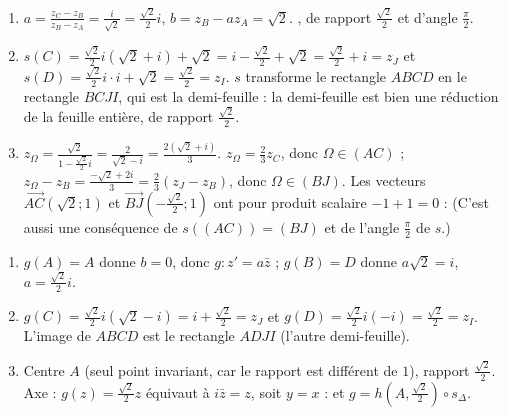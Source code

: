 \begin{corrige}
\begin{sol}
\begin{description}
\begin{enumerate}
            \item $a = \frac{z_C - z_B}{z_B - z_A} = \frac{i}{\sqrt2} = \frac{\sqrt2}{2}i$, $b = z_B - a z_A = \sqrt2$.
                  , de rapport $\frac{\sqrt2}{2}$ et d'angle $\frac{\pi}{2}$.
            \item $s(C) = \frac{\sqrt2}{2}i(\sqrt2 + i) + \sqrt2 = i - \frac{\sqrt2}{2} + \sqrt2 = \frac{\sqrt2}{2} + i = z_J$ et
                  $s(D) = \frac{\sqrt2}{2}i \cdot i + \sqrt2 = \frac{\sqrt2}{2} = z_I$.
                  $s$ transforme le rectangle $ABCD$ en le rectangle $BCJI$, qui est la demi-feuille : la demi-feuille est bien une réduction
                  de la feuille entière, de rapport $\frac{\sqrt2}{2}$.
            \item $z_\Omega = \frac{\sqrt2}{1 - \frac{\sqrt2}{2}i} = \frac{2}{\sqrt2 - i} = \frac{2(\sqrt2 + i)}{3}$.
                  $z_\Omega = \frac23 z_C$, donc $\Omega \in (AC)$ ; $z_\Omega - z_B = \frac{-\sqrt2 + 2i}{3} = \frac23(z_J - z_B)$, donc $\Omega \in (BJ)$.
                  Les vecteurs $\overrightarrow{AC}(\sqrt2;1)$ et $\overrightarrow{BJ}\left(-\frac{\sqrt2}{2};1\right)$ ont pour produit scalaire $-1 + 1 = 0$ :
                  (C'est aussi une conséquence de $s((AC)) = (BJ)$ et de l'angle $\frac{\pi}{2}$ de $s$.)
      \end{enumerate}
      \item[Partie B.]
      \begin{enumerate}
            \item $g(A) = A$ donne $b = 0$, donc $g : z' = a\bar{z}$ ; $g(B) = D$ donne $a\sqrt2 = i$, $a = \frac{\sqrt2}{2}i$.
            \item $g(C) = \frac{\sqrt2}{2}i(\sqrt2 - i) = i + \frac{\sqrt2}{2} = z_J$ et $g(D) = \frac{\sqrt2}{2}i(-i) = \frac{\sqrt2}{2} = z_I$.
                  L'image de $ABCD$ est le rectangle $ADJI$ (l'autre demi-feuille).
            \item Centre $A$ (seul point invariant, car le rapport est différent de $1$), rapport $\frac{\sqrt2}{2}$.
                  Axe : $g(z) = \frac{\sqrt2}{2}z$ équivaut à $i\bar{z} = z$, soit $y = x$ :
                   et $g = h\left(A,\frac{\sqrt2}{2}\right) \circ s_{\Delta}$.
      \end{enumerate}

\end{description}
\end{sol}
\end{corrige}
